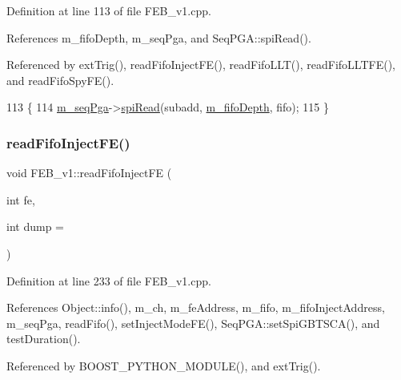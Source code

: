 Definition at line 113 of file F\+E\+B\+\_\+v1.\+cpp.



References m\+\_\+fifo\+Depth, m\+\_\+seq\+Pga, and Seq\+P\+G\+A\+::spi\+Read().



Referenced by ext\+Trig(), read\+Fifo\+Inject\+F\+E(), read\+Fifo\+L\+L\+T(), read\+Fifo\+L\+L\+T\+F\+E(), and read\+Fifo\+Spy\+F\+E().


\begin{DoxyCode}
113                                                               \{
114   \hyperlink{classFEB__v1_a6c7804ac86796f233a8393043adf2e77}{m\_seqPga}->\hyperlink{classSeqPGA_ab3d0e5e5d4014bc7a92588a76b8713d4}{spiRead}(subadd, \hyperlink{classFEB__v1_a30473bcdd8f018ad5dac728f6779df9c}{m\_fifoDepth}, fifo);
115 \}
\end{DoxyCode}
\mbox{\label{classFEB__v1_ab370d9f02895e1a44ab19d320255123e}} 
\subsubsection{\texorpdfstring{read\+Fifo\+Inject\+F\+E()}{readFifoInjectFE()}}
{\footnotesize\ttfamily void F\+E\+B\+\_\+v1\+::read\+Fifo\+Inject\+FE (\begin{DoxyParamCaption}\item[{int}]{fe,  }\item[{int}]{dump = {} }\end{DoxyParamCaption})}



Definition at line 233 of file F\+E\+B\+\_\+v1.\+cpp.



References Object\+::info(), m\+\_\+ch, m\+\_\+fe\+Address, m\+\_\+fifo, m\+\_\+fifo\+Inject\+Address, m\+\_\+seq\+Pga, read\+Fifo(), set\+Inject\+Mode\+F\+E(), Seq\+P\+G\+A\+::set\+Spi\+G\+B\+T\+S\+C\+A(), and test\+Duration().



Referenced by B\+O\+O\+S\+T\+\_\+\+P\+Y\+T\+H\+O\+N\+\_\+\+M\+O\+D\+U\+L\+E(), and ext\+Trig().


